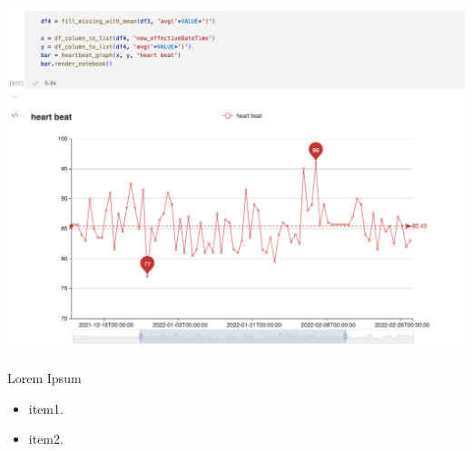 \documentclass[11pt, oneside]{article}
\begin{document}
\begin{center}
\includegraphics[scale=0.4]{4_hb_mean.png}
\end{center}

Lorem Ipsum

\begin{itemize}
\item item1.
\item item2.
\end{itemize}
\end{document}

